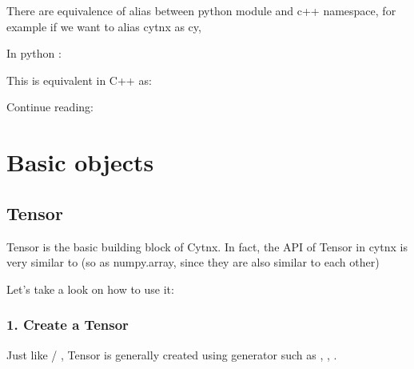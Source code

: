 \documentclass[letterpaper,10pt,english]{sphinxmanual}
\begin{document}
There are equivalence of alias between python module and c++ namespace, for example if we want to alias cytnx as cy,

In python :

\begin{sphinxVerbatim}[commandchars=\\\{\},numbers=left,firstnumber=1,stepnumber=1]
   
\end{sphinxVerbatim}

This is equivalent in C++ as:

\begin{sphinxVerbatim}[commandchars=\\\{\},numbers=left,firstnumber=1,stepnumber=1]
 
 
\end{sphinxVerbatim}


Continue reading:


\section{Basic objects}
\label{\detokenize{guide/basic_obj:basic-objects}}\label{\detokenize{guide/basic_obj::doc}}

\subsection{Tensor}
\label{\detokenize{guide/basic_obj/Tensor:tensor}}\label{\detokenize{guide/basic_obj/Tensor::doc}}
Tensor is the basic building block of Cytnx.
In fact, the API of Tensor in cytnx is very similar to  (so as numpy.array, since they are also similar to each other)

Let’s take a look on how to use it:


\subsubsection{1. Create a Tensor}
\label{\detokenize{guide/basic_obj/Tensor_1_creat:create-a-tensor}}\label{\detokenize{guide/basic_obj/Tensor_1_creat::doc}}
Just like  / , Tensor is generally created using generator such as , , .
\end{document}
